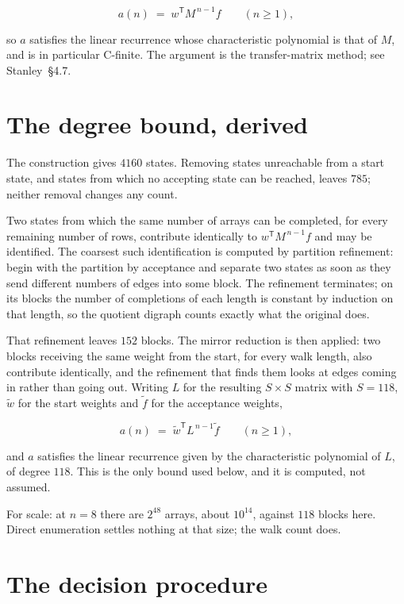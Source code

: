 \documentclass[11pt]{article}
\theoremstyle{definition}
\begin{document}
\[a(n) \;=\; w^{\mathsf T} M^{\,n-1} f \qquad (n \ge 1),\]

so $a$ satisfies the linear recurrence whose characteristic polynomial is that of $M$, and is in particular C-finite. The argument is the transfer-matrix method; see Stanley~\S4.7.

\section{The degree bound, derived}

The construction gives $4160$ states. Removing states unreachable from a start state, and states from which no accepting state can be reached, leaves $785$; neither removal changes any count.

Two states from which the same number of arrays can be completed, for every remaining number of rows, contribute identically to $w^{\mathsf T}M^{\,n-1}f$ and may be identified. The coarsest such identification is computed by partition refinement: begin with the partition by acceptance and separate two states as soon as they send different numbers of edges into some block. The refinement terminates; on its blocks the number of completions of each length is constant by induction on that length, so the quotient digraph counts exactly what the original does.

That refinement leaves $152$ blocks. The mirror reduction is then applied: two blocks receiving the same weight from the start, for every walk length, also contribute identically, and the refinement that finds them looks at edges coming in rather than going out. Writing $L$ for the resulting $S \times S$ matrix with $S = 118$, $\tilde w$ for the start weights and $\tilde f$ for the acceptance weights,

\[a(n) \;=\; \tilde w^{\mathsf T} L^{\,n-1} \tilde f \qquad (n \ge 1),\]

and $a$ satisfies the linear recurrence given by the characteristic polynomial of $L$, of degree $118$. This is the only bound used below, and it is computed, not assumed.

For scale: at $n = 8$ there are $2^{48}$ arrays, about $10^{14}$, against $118$ blocks here. Direct enumeration settles nothing at that size; the walk count does.

\section{The decision procedure}
\end{document}

